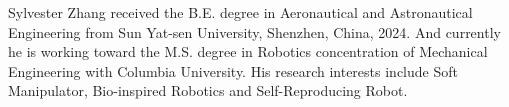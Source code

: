 \documentclass[lettersize,journal]{IEEEtran}
\begin{document}


 

\begin{IEEEbiography}{Sylvester Zhang}
 received the B.E. degree in Aeronautical and Astronautical Engineering from Sun Yat-sen University, Shenzhen, China, 2024. And currently he is working toward the M.S. degree in Robotics concentration of Mechanical Engineering with Columbia University. His research interests include Soft Manipulator, Bio-inspired Robotics and  Self-Reproducing Robot.
\end{IEEEbiography}




\vfill
\end{document}
